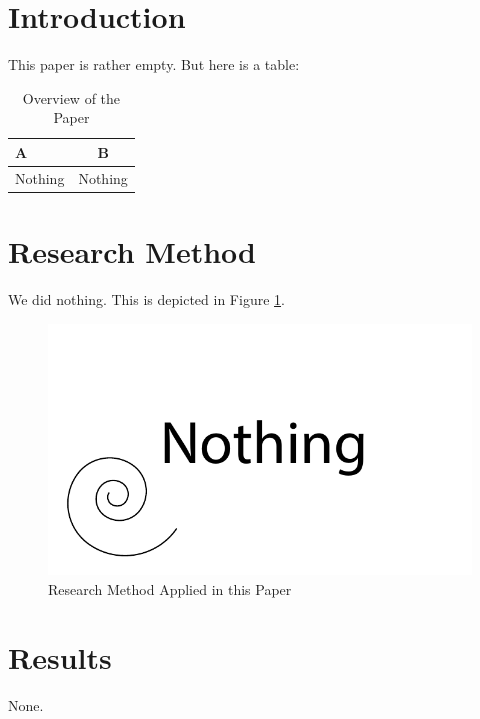 
\section{Introduction}
This paper is rather empty.
But here is a table:
\begin{table}[!ht]
\caption{Overview of the Paper}
\label{tb:paperB_overview}
\centering
\begin{tabular}{|p{.35\linewidth}|c|}
\hline
A&B\\
\hline
\hline
Nothing & Nothing\\
\hline
\end{tabular}
\end{table}

\section{Research Method}
We did nothing.
This is depicted in Figure \ref{fig:paperB_method}.

\begin{figure}[!htb]
  \centering
  \includegraphics[width=\textwidth]{papers/paperB/method.pdf}
  \caption{Research Method Applied in this Paper}
  \label{fig:paperB_method}
\end{figure}

\section{Results}
None.